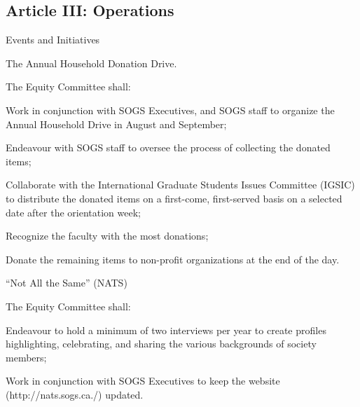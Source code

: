 \subsection{Article III: Operations}
\begin{longenum}[ label*=\thesubsection.\arabic*., align=left] 
\item Events and Initiatives
	\begin{longenum}[ label*=\arabic*., align=left] 
	\item The Annual Household Donation Drive.
		\begin{longenum}[ label*=\arabic*., align=left] 
		\item The Equity Committee shall:
			\begin{longenum}[ label*=\arabic*., align=left] 
			\item Work in conjunction with SOGS Executives, and SOGS staff to organize the Annual Household Drive in August and September;
			\item Endeavour with SOGS staff to oversee the process of collecting the donated items;
			\item Collaborate with the International Graduate Students Issues Committee (IGSIC) to distribute the donated items on a first-come, first-served basis on a selected date after the orientation week;
			\item Recognize the faculty with the most donations;
			\item Donate the remaining items to non-profit organizations at the end of the day.
			\end{longenum}
		\end{longenum}
	\item “Not All the Same” (NATS)
		\begin{longenum}[ label*=\arabic*., align=left] 
		\item The Equity Committee shall:
			\begin{longenum}[ label*=\arabic*., align=left] 
			\item Endeavour to hold a minimum of two interviews per year to create profiles highlighting, celebrating, and sharing the various backgrounds of society members;
			\item Work in conjunction with SOGS Executives to keep the website (http://nats.sogs.ca./) updated.
			\end{longenum}
		\end{longenum}
	\end{longenum}
\end{longenum}